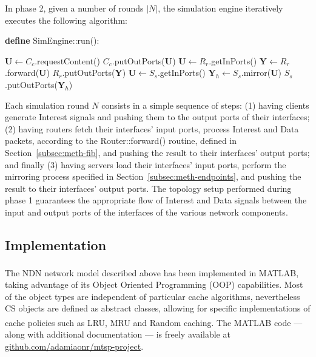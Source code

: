 In phase 2, given a number of rounds $|N|$, the simulation engine iteratively 
executes the following algorithm:\shortvertbreak

\begin{algorithmic}[1]

\State \textbf{define} SimEngine::run():
\State

        \Statex[2]
            \State $\textbf{U} \leftarrow C_c$.requestContent()
            \State $C_c$.putOutPorts(\textbf{U})
        \EndFor
        \Statex[2]
            \State $\textbf{U} \leftarrow R_r$.getInPorts()
            \State $\textbf{Y} \leftarrow R_r$.forward(\textbf{U})
            \State $R_r$.putOutPorts(\textbf{Y})
        \EndFor
        \Statex[2]
            \State $\textbf{U} \leftarrow S_s$.getInPorts()
            \State $\textbf{Y}_h \leftarrow S_s$.mirror(\textbf{U})
            \State $S_s$.putOutPorts($\textbf{Y}_h$)
        \EndFor
        \Statex[2]
    \EndFor

\end{algorithmic}\shortvertbreak

Each simulation round $N$ consists in a simple sequence of steps: (1) 
having clients generate Interest signals and pushing them to the output ports of their interfaces; 
(2) having routers fetch their interfaces' input ports, process Interest and 
Data packets, according to the Router::forward() 
routine, defined in Section~\ref{subsec:meth-fib}, and pushing the result to their 
interfaces' output ports; and finally (3) having servers load 
their interfaces' input ports, 
perform the mirroring process specified in Section~\ref{subsec:meth-endpoints}, and 
pushing the result to their interfaces' output ports. 
The topology setup performed during phase 1 guarantees the appropriate flow of 
Interest and Data signals between the input and output ports of the interfaces 
of the various network components.

\subsection{Implementation}
\label{subsec:meth-impl}

The NDN network model described above has been implemented in MATLAB\textsuperscript{\textregistered}, taking 
advantage of its Object Oriented Programming (OOP) capabilities. Most of 
the object types are independent of particular cache algorithms, nevertheless 
CS objects are defined as abstract classes, allowing for specific 
implementations of cache policies such as LRU, MRU and Random caching. The 
MATLAB\textsuperscript{\textregistered} 
code --- along with additional documentation --- is freely available 
at \url{github.com/adamiaonr/mtsp-project}.

